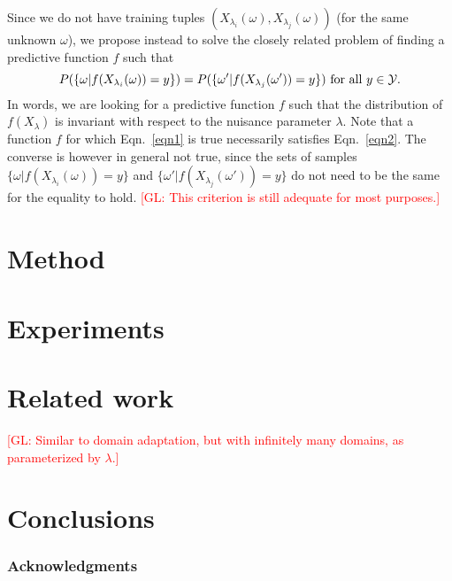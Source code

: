 \documentclass{article}
\newcommand{\glnote}[1]{\textcolor{red}{[GL: #1]}}
\theoremstyle{plain}
\begin{document}
Since we do not have training tuples $(X_{\lambda_i}(\omega),
X_{\lambda_j}(\omega))$ (for the same unknown $\omega$), we propose instead to
solve the closely related problem of finding a predictive function $f$ such that
\begin{equation}\label{eqn2}
    P(\{ \omega | f(X_{\lambda_i}(\omega)) = y \} ) = P( \{ \omega' | f(X_{\lambda_j}(\omega')) = y\}) \text{ for all $y \in {\cal Y}$}.
\end{equation}
In words, we are looking for a predictive function $f$ such that  the
distribution of $f(X_\lambda)$ is invariant with respect to the nuisance
parameter $\lambda$. Note that a function $f$ for which Eqn.~\ref{eqn1} is
true necessarily satisfies Eqn.~\ref{eqn2}. The converse is however in
general not true, since the sets of samples $\{ \omega | f(X_{\lambda_i}(\omega)) = y \}$
and $\{ \omega' | f(X_{\lambda_j}(\omega')) = y \}$ do not need to be the same
for the equality to hold. \glnote{This criterion is still adequate for most purposes.}

\section{Method}
\label{sec:method}

\section{Experiments}

\section{Related work}

\glnote{Similar to domain adaptation, but with infinitely many domains,
as parameterized by $\lambda$.}

\section{Conclusions}

\subsubsection*{Acknowledgments}


{\small
}
\end{document}

